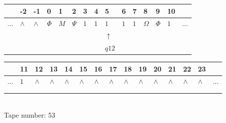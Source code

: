 \documentclass[11pt]{article}
\begin{document}
\begin{table}[H]
\centering
\begin{tabular}{lllllllllllllll}
 & -2 & -1 & 0 & 1 & 2 & 3 & 4 & 5 & 6 & 7 & 8 & 9 & 10 & \\
\hline
$...$ & \multicolumn{1}{|l|}{$\wedge$} & \multicolumn{1}{|l|}{$\wedge$} & \multicolumn{1}{|l|}{$\Phi$} & \multicolumn{1}{|l|}{$M$} & \multicolumn{1}{|l|}{$\Psi$} & \multicolumn{1}{|l|}{$1$} & \multicolumn{1}{|l|}{$1$} & \multicolumn{1}{|l|}{$1$} & \multicolumn{1}{|l|}{$1$} & \multicolumn{1}{|l|}{$1$} & \multicolumn{1}{|l|}{$\Omega$} & \multicolumn{1}{|l|}{$\Phi$} & \multicolumn{1}{|l|}{$1$} & $...$\\
\hline
&  &  &  &  &  &  &  & $\uparrow$ &  &  &  &  &  &  \\
&  &  &  &  &  &  &  & $ q12 $ &  &  &  &  &  &  \\
\end{tabular}
\begin{tabular}{lllllllllllllll}
 & 11 & 12 & 13 & 14 & 15 & 16 & 17 & 18 & 19 & 20 & 21 & 22 & 23 & \\
\hline
$...$ & \multicolumn{1}{|l|}{$1$} & \multicolumn{1}{|l|}{$\wedge$} & \multicolumn{1}{|l|}{$\wedge$} & \multicolumn{1}{|l|}{$\wedge$} & \multicolumn{1}{|l|}{$\wedge$} & \multicolumn{1}{|l|}{$\wedge$} & \multicolumn{1}{|l|}{$\wedge$} & \multicolumn{1}{|l|}{$\wedge$} & \multicolumn{1}{|l|}{$\wedge$} & \multicolumn{1}{|l|}{$\wedge$} & \multicolumn{1}{|l|}{$\wedge$} & \multicolumn{1}{|l|}{$\wedge$} & \multicolumn{1}{|l|}{$\wedge$} & $...$\\
\hline
&  &  &  &  &  &  &  &  &  &  &  &  &  &  \\
&  &  &  &  &  &  &  &  &  &  &  &  &  &  \\
\end{tabular}
\\
Tape number: 53
\noindent\makebox[\linewidth]{\hdashrule{\textwidth}{1pt}{1pt}}\end{table}
\end{document}
